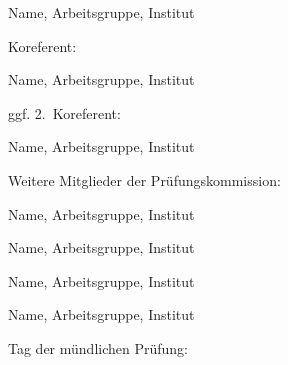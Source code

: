 Name, Arbeitsgruppe, Institut
\vspace{\baselineskip}

\noindent Koreferent:

Name, Arbeitsgruppe, Institut
\vspace{\baselineskip}

\noindent ggf. 2.~Koreferent:

Name, Arbeitsgruppe, Institut
\vspace{\baselineskip}

\noindent Weitere Mitglieder der Prüfungskommission:
\vspace{\baselineskip}

Name, Arbeitsgruppe, Institut
\vspace{\baselineskip}

Name, Arbeitsgruppe, Institut
\vspace{\baselineskip}

Name, Arbeitsgruppe, Institut
\vspace{\baselineskip}

Name, Arbeitsgruppe, Institut
\vspace{3\baselineskip}

\noindent Tag der mündlichen Prüfung: \underline{\hspace{3cm}}


\cleardoublepage


% 
% 
% 



